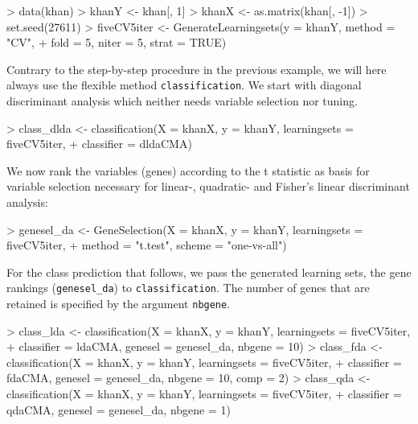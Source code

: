  
\begin{Schunk}
\begin{Sinput}
> data(khan)
> khanY <- khan[, 1]
> khanX <- as.matrix(khan[, -1])
> set.seed(27611)
> fiveCV5iter <- GenerateLearningsets(y = khanY, method = "CV", 
+     fold = 5, niter = 5, strat = TRUE)
\end{Sinput}
\end{Schunk}

Contrary to the step-by-step procedure in the previous example, we will here always use
the flexible method \texttt{classification}. We start with diagonal
discriminant analysis which neither needs variable selection nor tuning. 


\begin{Schunk}
\begin{Sinput}
> class_dlda <- classification(X = khanX, y = khanY, learningsets = fiveCV5iter, 
+     classifier = dldaCMA)
\end{Sinput}
\end{Schunk}

We now rank the variables (genes) according to the t statistic as basis for
variable selection necessary for linear-, quadratic- and Fisher's linear discriminant
analysis:

\begin{Schunk}
\begin{Sinput}
> genesel_da <- GeneSelection(X = khanX, y = khanY, learningsets = fiveCV5iter, 
+     method = "t.test", scheme = "one-vs-all")
\end{Sinput}
\end{Schunk}

For the class prediction that follows, we pass the generated learning sets,
the gene rankings (\verb+genesel_da+) to \texttt{classification}. The
number of genes that are retained is specified by the argument \texttt{nbgene}.

\begin{Schunk}
\begin{Sinput}
> class_lda <- classification(X = khanX, y = khanY, learningsets = fiveCV5iter, 
+     classifier = ldaCMA, genesel = genesel_da, nbgene = 10)
> class_fda <- classification(X = khanX, y = khanY, learningsets = fiveCV5iter, 
+     classifier = fdaCMA, genesel = genesel_da, nbgene = 10, comp = 2)
> class_qda <- classification(X = khanX, y = khanY, learningsets = fiveCV5iter, 
+     classifier = qdaCMA, genesel = genesel_da, nbgene = 1)
\end{Sinput}
\end{Schunk}

